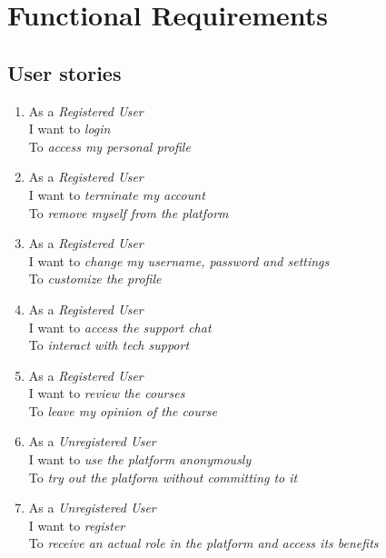 \section{Functional Requirements} \label{functional-requirements}

\subsection{User stories}

\begin{enumerate}
	\item As a \textit{Registered User} \\
	I want to \textit{login} \\
	To \textit{access my personal profile}
	\item As a \textit{Registered User} \\
	I want to \textit{terminate my account} \\
	To \textit{remove myself from the platform}
	\item As a \textit{Registered User} \\
	I want to \textit{change my username, password and settings} \\
	To \textit{customize the profile}
	\item As a \textit{Registered User} \\
	I want to \textit{access the support chat} \\
	To \textit{interact with tech support}
	\item As a \textit{Registered User} \\
	I want to \textit{review the courses} \\
	To \textit{leave my opinion of the course}
	
	\item As a \textit{Unregistered User} \\
	I want to \textit{use the platform anonymously} \\
	To \textit{try out the platform without committing to it}
	\item As a \textit{Unregistered User} \\
	I want to \textit{register} \\
	To \textit{receive an actual role in the platform and access its benefits}
	

\end{enumerate}
